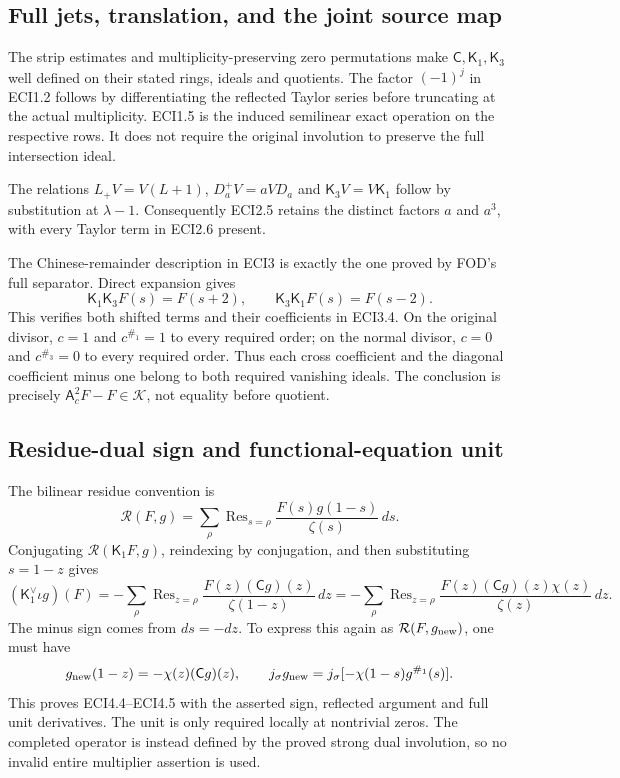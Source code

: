 \subsection{Full jets, translation, and the joint source
map}\label{full-jets-translation-and-the-joint-source-map}

The strip estimates and multiplicity-preserving zero permutations make
\(\mathsf C,\mathsf K_1,\mathsf K_3\) well defined on their stated
rings, ideals and quotients. The factor \((-1)^j\) in ECI1.2 follows by
differentiating the reflected Taylor series before truncating at the
actual multiplicity. ECI1.5 is the induced semilinear exact operation on
the respective rows. It does not require the original involution to
preserve the full intersection ideal.

The relations \(L_+V=V(L+1)\), \(D_a^+V=aVD_a\) and
\(\mathsf K_3V=V\mathsf K_1\) follow by substitution at \(\lambda-1\).
Consequently ECI2.5 retains the distinct factors \(a\) and \(a^3\), with
every Taylor term in ECI2.6 present.

The Chinese-remainder description in ECI3 is exactly the one proved by
FOD's full separator. Direct expansion gives \[
\mathsf K_1\mathsf K_3F(s)=F(s+2),\qquad
\mathsf K_3\mathsf K_1F(s)=F(s-2).
\] This verifies both shifted terms and their coefficients in ECI3.4. On
the original divisor, \(c=1\) and \(c^{\#_1}=1\) to every required
order; on the normal divisor, \(c=0\) and \(c^{\#_3}=0\) to every
required order. Thus each cross coefficient and the diagonal coefficient
minus one belong to both required vanishing ideals. The conclusion is
precisely \(\mathsf A_c^2F-F\in\mathcal K\), not equality before
quotient.

\subsection{Residue-dual sign and functional-equation
unit}\label{residue-dual-sign-and-functional-equation-unit}

The bilinear residue convention is \[
\mathcal R(F,g)=\sum_\rho\operatorname{Res}_{s=\rho}
\frac{F(s)g(1-s)}{\zeta(s)}\,ds.
\] Conjugating \(\mathcal R(\mathsf K_1F,g)\), reindexing by
conjugation, and then substituting \(s=1-z\) gives \[
(\mathsf K_1^\vee\iota g)(F)
=-\sum_\rho\operatorname{Res}_{z=\rho}
\frac{F(z)(\mathsf Cg)(z)}{\zeta(1-z)}\,dz
=-\sum_\rho\operatorname{Res}_{z=\rho}
\frac{F(z)(\mathsf Cg)(z)\chi(z)}{\zeta(z)}\,dz.
\] The minus sign comes from \(ds=-dz\). To express this again as
\(\mathcal R(F,g_{\rm new})\), one must have \[
g_{\rm new}(1-z)=-\chi(z)(\mathsf Cg)(z),
\qquad
j_\sigma g_{\rm new}
=j_\sigma[-\chi(1-s)g^{\#_1}(s)].
\] This proves ECI4.4--ECI4.5 with the asserted sign, reflected argument
and full unit derivatives. The unit is only required locally at
nontrivial zeros. The completed operator is instead defined by the
proved strong dual involution, so no invalid entire multiplier assertion
is used.

